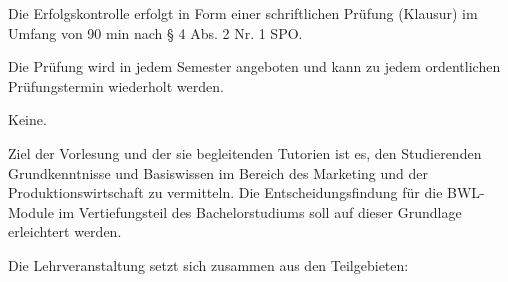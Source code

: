 \begin{course}

\setdoclanguagegerman
{}



\coursehead


\label{cour_6081.dp_997}


\begin{styleenv}
\begin{assessment}
Die Erfolgskontrolle erfolgt in Form einer schriftlichen Prüfung (Klausur) im Umfang von 90 min nach § 4 Abs. 2 Nr. 1 SPO.

 

Die Prüfung wird in jedem Semester angeboten und kann zu jedem ordentlichen Prüfungstermin wiederholt werden.


\end{assessment}

\begin{conditions}Keine.\end{conditions}


\end{styleenv}

\begin{learningoutcomes}
Ziel der Vorlesung und der sie begleitenden Tutorien ist es, den Studierenden Grundkenntnisse und Basiswissen im Bereich des Marketing und der Produktionswirtschaft zu vermitteln. Die Entscheidungsfindung für die BWL-Module im Vertiefungsteil des Bachelorstudiums soll auf dieser Grundlage erleichtert werden.


\end{learningoutcomes}

\begin{content}
Die Lehrveranstaltung setzt sich zusammen aus den Teilgebieten:


\end{content}
\end{course}
